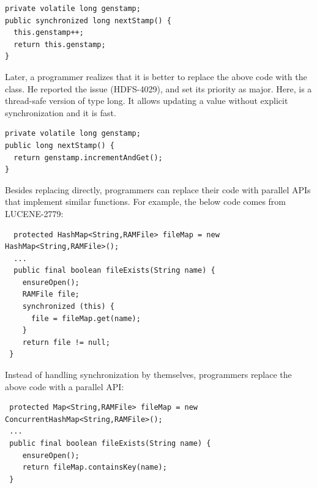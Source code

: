 \begin{lstlisting}
private volatile long genstamp;
public synchronized long nextStamp() {
  this.genstamp++;
  return this.genstamp;
}
\end{lstlisting}

Later, a programmer realizes that it is better to replace the above code with the  class. He reported the issue (HDFS-4029), and set its priority as major. Here,  is a thread-safe version of type long. It allows updating a  value without explicit synchronization and it is fast.



\begin{lstlisting}
private volatile long genstamp;
public long nextStamp() {
  return genstamp.incrementAndGet();
}
\end{lstlisting}

Besides replacing directly, programmers can replace their code with parallel APIs that implement similar functions. For example, the below code comes from LUCENE-2779:

\begin{lstlisting}
  protected HashMap<String,RAMFile> fileMap = new HashMap<String,RAMFile>();
  ...
  public final boolean fileExists(String name) {
    ensureOpen();
    RAMFile file;
    synchronized (this) {
      file = fileMap.get(name);
    }
    return file != null;
 }
\end{lstlisting}

Instead of handling synchronization by themselves, programmers replace the above code with a parallel API:

\begin{lstlisting}
 protected Map<String,RAMFile> fileMap = new ConcurrentHashMap<String,RAMFile>();
 ...
 public final boolean fileExists(String name) {
    ensureOpen();
    return fileMap.containsKey(name);
 }
\end{lstlisting}

%
%
%
%
%
%

